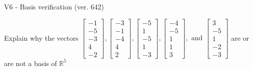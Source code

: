 \begin{exercise}
  \begin{exerciseTitle}V6 - Basis verification (ver. 642)\end{exerciseTitle}
  \begin{exerciseStatement}
    Explain why the vectors \(\left[\begin{array}{r}
-1 \\
-5 \\
-3 \\
4 \\
-2
\end{array}\right] , \left[\begin{array}{r}
-3 \\
-1 \\
-4 \\
4 \\
2
\end{array}\right] , \left[\begin{array}{r}
-5 \\
1 \\
-5 \\
1 \\
-3
\end{array}\right] , \left[\begin{array}{r}
-4 \\
-5 \\
1 \\
1 \\
3
\end{array}\right] , \text{ and } \left[\begin{array}{r}
3 \\
-5 \\
1 \\
-2 \\
-3
\end{array}\right]\) are or are not a basis of \(\mathbb{R}^5\)	



\end{exerciseStatement}
\end{exercise}
